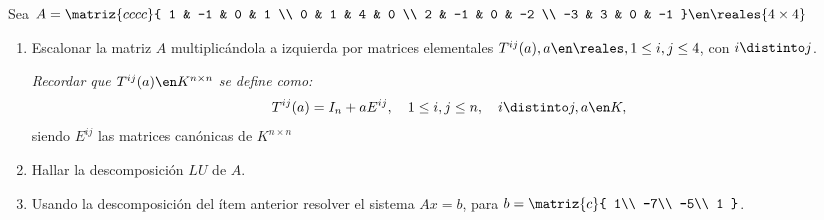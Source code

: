 \begin{enunciado}{\ejercicio}
  Sea $A =
    \matriz{cccc}{
      1 & -1 & 0 & 1 \\
      0 & 1 & 4 & 0 \\
      2 & -1 & 0 & -2 \\
      -3 & 3 & 0 & -1
    } \en \reales{4 \times 4}$

  \begin{enumerate}[label=(\alph*)]
    \item Escalonar la matriz $A$ multiplicándola a izquierda por matrices
          elementales $T^{ij}(a), a \en \reales, 1\leq i, j \leq 4$, con $i \distinto j$.

          \textit{Recordar que $T^{ij}(a) \en K^{n \times n}$ se define como:}
          $$
            T^{ij}(a) = I_n + a E^{ij}, \quad 1\leq i,j \leq n,\quad i\distinto j, a \en K,
          $$
          siendo $E^{ij}$ las matrices canónicas de $K^{n \times n}$

    \item Hallar la descomposición $LU$ de $A$.

    \item\label{ej:2-item-c} Usando la descomposición del ítem anterior resolver el sistema $Ax = b$,
          para
          $b =
            \matriz{c}{
              1\\
              -7\\
              -5\\
              1
            }$.
  \end{enumerate}
\end{enunciado}

\hacer
